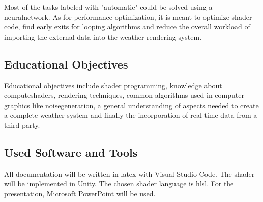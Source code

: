 \noindent
Most of the tasks labeled with "automatic" could be solved using a \gls{neuralnetwork}.
As for performance optimization, it is meant to optimize shader code, find early exits for looping algorithms and reduce the overall workload of importing the external data into the weather rendering system.

\subsection{Educational Objectives}
Educational objectives include \gls{shader} programming, knowledge about \gls{computeshader}s, rendering techniques, common algorithms used in computer graphics like \gls{noisegeneration}, a general understanding of aspects needed to create a complete weather system and finally the incorporation of real-time data from a third party.

\subsection{Used Software and Tools}
All documentation will be written in \gls{latex} with Visual Studio Code.
The \gls{shader} will be implemented in Unity. The chosen \gls{shader} language is \gls{hlsl}.
For the presentation, Microsoft PowerPoint will be used.